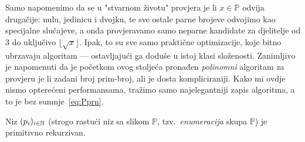 Samo napomenimo da se u "stvarnom životu" provjera je li $x\in\mathbb P$ odvija drugačije: nulu, jedinicu i dvojku, te sve ostale parne brojeve odvojimo kao specijalne slučajeve, a onda provjeravamo samo neparne kandidate za djelitelje od 3 do uključivo $\lfloor\sqrt{x}\rfloor$. Ipak, to su sve samo praktične optimizacije, koje bitno ubrzavaju algoritam --- ostavljajući ga doduše u istoj klasi složenosti. Zanimljivo je napomenuti da je početkom ovog stoljeća pronađen \emph{polinomni} algoritam za provjeru je li zadani broj prim-broj, ali je dosta kompliciraniji. Kako mi ovdje nismo opterećeni performansama, tražimo samo najelegantniji zapis algoritma, a to je bez sumnje~\eqref{eq:Pprn}.

\begin{propozicija}
    Niz $(p_i)_{i\in{\mathbb N}}$ (strogo rastući niz sa slikom $\mathbb P$, tzv.\ \emph{enumeracija} skupa $\mathbb P$) je primitivno rekurzivan.
\end{propozicija}

